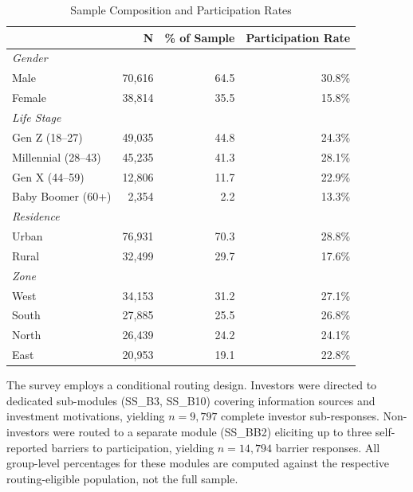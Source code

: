 \documentclass[conference]{IEEEtran}
\begin{document}
\begin{table}[htbp]
\caption{Sample Composition and Participation Rates}
\label{tab:descriptive}
\centering
\begin{tabular}{lrrr}
\toprule
& \textbf{N} & \textbf{\% of Sample} & \textbf{Participation Rate} \\
\midrule
\multicolumn{4}{l}{\textit{Gender}} \\
\quad Male   & 70,616 & 64.5 & 30.8\% \\
\quad Female & 38,814 & 35.5 & 15.8\% \\
\midrule
\multicolumn{4}{l}{\textit{Life Stage}} \\
\quad Gen Z (18--27)       & 49,035 & 44.8 & 24.3\% \\
\quad Millennial (28--43)  & 45,235 & 41.3 & 28.1\% \\
\quad Gen X (44--59)       & 12,806 & 11.7 & 22.9\% \\
\quad Baby Boomer (60+)    &  2,354 &  2.2 & 13.3\% \\
\midrule
\multicolumn{4}{l}{\textit{Residence}} \\
\quad Urban & 76,931 & 70.3 & 28.8\% \\
\quad Rural & 32,499 & 29.7 & 17.6\% \\
\midrule
\multicolumn{4}{l}{\textit{Zone}} \\
\quad West  & 34,153 & 31.2 & 27.1\% \\
\quad South & 27,885 & 25.5 & 26.8\% \\
\quad North & 26,439 & 24.2 & 24.1\% \\
\quad East  & 20,953 & 19.1 & 22.8\% \\
\bottomrule
\end{tabular}
\end{table}

The survey employs a conditional routing design. Investors were directed to dedicated sub-modules (SS\_B3, SS\_B10) covering information sources and investment motivations, yielding $n = 9{,}797$ complete investor sub-responses. Non-investors were routed to a separate module (SS\_BB2) eliciting up to three self-reported barriers to participation, yielding $n = 14{,}794$ barrier responses. All group-level percentages for these modules are computed against the respective routing-eligible population, not the full sample.
\end{document}
